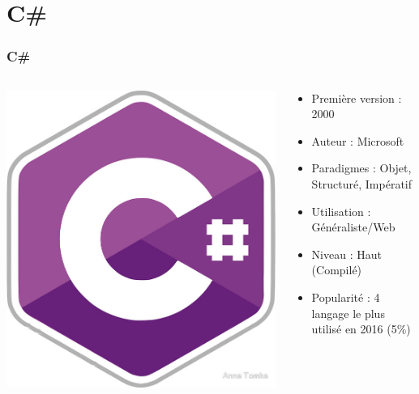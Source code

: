 \documentclass{beamer}
\begin{document}
	\section{C\#}
	\begin{frame}
	\frametitle{C\#}
	\begin{columns}

	\begin{column}{3cm}
			\includegraphics[scale=0.15]{csharp.jpg} 
	\end{column}

	\begin{column}{7cm}
		\begin{itemize}
			\item Première version : 2000
			\item Auteur : Microsoft
			\item Paradigmes : Objet, Structuré, Impératif
			\item Utilisation : Généraliste/Web
			\item Niveau : Haut (Compilé)
			\item Popularité : 4 langage le plus utilisé en 2016 (5\%)
		\end{itemize}
	\end{column}
	\end{columns}
	\end{frame}
	
\end{document}
